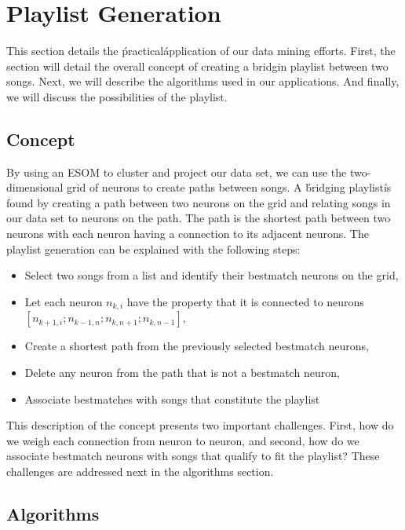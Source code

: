 \section{Playlist Generation} %
\label{sec:playlist_generation}

This section details the \'practical\' application of our data mining efforts. First, the section will detail
the overall concept of creating a bridgin playlist between two songs. Next, we will describe the algorithms used in our applications. And finally, we will discuss the possibilities of the playlist.

\subsection{Concept}
By using an ESOM to cluster and project our data set, we can use the two-dimensional grid of neurons to create paths between songs. A \'bridging playlist\' is found by creating a path between two neurons on the grid and relating songs in our data set to neurons on the path. The path is the shortest path between two neurons with each neuron having a connection to its adjacent neurons. The playlist generation can be explained with the following steps:
\begin{itemize}
\item Select two songs from a list and identify their bestmatch neurons on the grid, \\
\item Let each neuron $ n_{k,i} $  have the property that it is connected to neurons $ [ n_{k+1,i} ; n_{k-1,n} ; n_{k,n+1} ; n_{k,n-1} ], $ \\
\item Create a shortest path from the previously selected bestmatch neurons, \\
\item Delete any neuron from the path that is not a bestmatch neuron, \\
\item Associate bestmatches with songs that constitute the playlist
\end{itemize}

This description of the concept presents two important challenges. First, how do we weigh each connection from neuron to neuron, and second, how do we associate bestmatch neurons with songs that qualify to fit the playlist?
These challenges are addressed next in the algorithms section.\\

\subsection{Algorithms}

